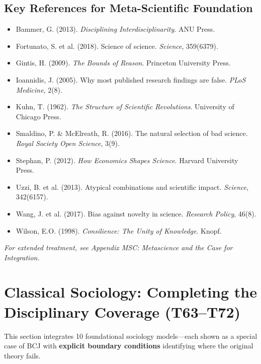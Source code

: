 \subsection{Key References for Meta-Scientific Foundation}

\begin{itemize}[nosep]
\item Bammer, G. (2013). \textit{Disciplining Interdisciplinarity}. ANU Press.
\item Fortunato, S. et al. (2018). Science of science. \textit{Science}, 359(6379).
\item Gintis, H. (2009). \textit{The Bounds of Reason}. Princeton University Press.
\item Ioannidis, J. (2005). Why most published research findings are false. \textit{PLoS Medicine}, 2(8).
\item Kuhn, T. (1962). \textit{The Structure of Scientific Revolutions}. University of Chicago Press.
\item Smaldino, P. \& McElreath, R. (2016). The natural selection of bad science. \textit{Royal Society Open Science}, 3(9).
\item Stephan, P. (2012). \textit{How Economics Shapes Science}. Harvard University Press.
\item Uzzi, B. et al. (2013). Atypical combinations and scientific impact. \textit{Science}, 342(6157).
\item Wang, J. et al. (2017). Bias against novelty in science. \textit{Research Policy}, 46(8).
\item Wilson, E.O. (1998). \textit{Consilience: The Unity of Knowledge}. Knopf.
\end{itemize}

\textit{For extended treatment, see Appendix MSC: Metascience and the Case for Integration.}



\section{Classical Sociology: Completing the Disciplinary Coverage (T63--T72)}
\label{sec:bcj-sociology}

This section integrates 10 foundational sociology models---each shown as a special case of BCJ with \textbf{explicit boundary conditions} identifying where the original theory fails.

